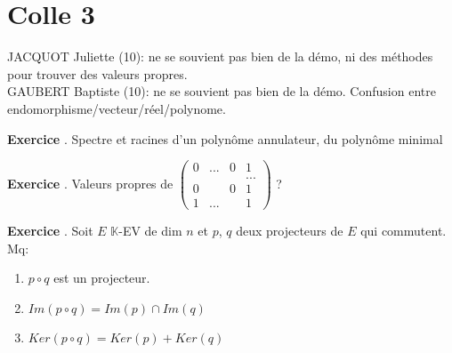 \documentclass[10pt,a4paper]{article}
\newcounter{question}
\newcounter{exo}
\newenvironment{exo}{\vspace{0.5cm}\setcounter{question}{0}\addtocounter{exo}{1} \noindent \textbf{Exercice \theexo}. \normalsize }{\par}
\begin{document}
	\section*{Colle 3}
	\setcounter{exo}{0}
	JACQUOT Juliette (10): ne se souvient pas bien de la démo, ni des méthodes pour trouver des valeurs propres.\\
	GAUBERT Baptiste (10): ne se souvient pas bien de la démo. Confusion entre endomorphisme/vecteur/réel/polynome.
	
	\begin{exo}
		Spectre et racines d'un polynôme annulateur, du polynôme minimal
	\end{exo}
	
	\begin{exo}
		Valeurs propres de $\begin{pmatrix}
		0 & ... & 0 & 1 \\ 
		&  &  & ... \\ 
		0 &  & 0 & 1 \\ 
		1 & ... &  & 1
		\end{pmatrix} $ ?
	\end{exo}
	
	\begin{exo}
		Soit $E$ $\mathbb{K}$-EV de dim $n$ et $p$, $q$ deux projecteurs de $E$ qui commutent.
		Mq:
		\begin{enumerate}
			\item $p \circ q$ est un projecteur.
			\item $Im(p \circ q) = Im(p) \cap Im(q)$
			\item $Ker(p \circ q) = Ker(p) + Ker(q)$
		\end{enumerate}
	\end{exo}
	 
\end{document}
